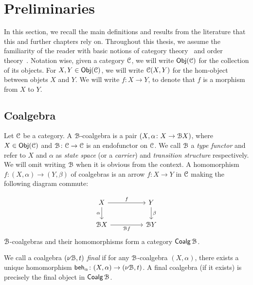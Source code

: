 \section{Preliminaries}\label{c2:sec:preliminaries}
In this section, we recall the main definitions and results from the literature that this and further chapters rely on. Throughout this thesis, we assume the familiarity of the reader with basic notions of category theory~\cite{Abramsky:2010:Introduction} and order theory~\cite{Davey:2002:Introduction}. Notation wise, given a category $\mathcal{C}$, we will write $\mathsf{Obj}(\mathcal{C})$ for the collection of its objects. For $X,Y \in \mathsf{Obj}(\mathcal{C})$, we will write $\mathcal{C}(X,Y)$ for the hom-object between objets $X$ and $Y$. We will write $f \colon X \to Y$, to denote that $f$ is a morphism from $X$ to $Y$.
\subsection{Coalgebra}\label{c2:subsec:coalgebra}

Let $\mathcal{C}$ be a category.  A $\mathcal{B}$-coalgebra is a pair $(X, \alpha \colon X \to \mathcal{B} X)$, where $X \in \mathsf{Obj}(\mathcal{C})$ and $\mathcal{B} \colon \mathcal{C} \to \mathcal{C}$ is an endofunctor on $\mathcal{C}$. We call $\mathcal{B}$ a \emph{type functor} and refer to $X$ and $\alpha$ as \emph{state space} (or a \emph{carrier}) and \emph{transition structure} respectively. We will omit writing $\mathcal{B}$ when it is obvious from the context. A homomorphism $f \colon (X, \alpha) \to (Y, \beta)$ of coalgebras is an arrow $f \colon X \to Y$ in $\mathcal{C}$ making the following diagram commute:

\[\begin{tikzcd}
	X && Y \\
	{\funB X} && {\funB Y}
	\arrow["f", from=1-1, to=1-3]
	\arrow["\alpha"', from=1-1, to=2-1]
	\arrow["\beta", from=1-3, to=2-3]
	\arrow["{\funB f}"', from=2-1, to=2-3]
\end{tikzcd}\]
$\mathcal{B}$-coalgebras and their homomorphisms form a category $\mathop{\mathsf{Coalg}}{\mathcal{B}}$. 

\begin{definition}\label{c2:def:final_coalgebra}
We call a coalgebra $(\nu \mathcal{B}, t)$ \emph{final} if for any $\mathcal{B}$-coalgebra $(X, \alpha)$, there exists a unique homomorphism $\mathsf{beh}_{\alpha} \colon (X, \alpha) \to (\nu \mathcal{B}, t)$. A final coalgebra (if it exists) is precisely the final object in $\mathop{\mathsf{Coalg}}{\mathcal{B}}$.	
\end{definition}


